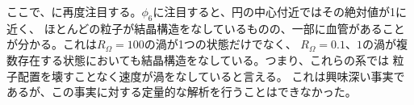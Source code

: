 \documentclass[/Users/ikedahajime/GitHub/reserch/master_report/thesis]{subfiles}
\begin{document}
ここで、に再度注目する。$\phi_6$に注目すると、円の中心付近ではその絶対値が1に近く、
ほとんどの粒子が結晶構造をなしているものの、一部に血管があることが分かる。これは$R_{\Omega}=100$の渦が1つの状態だけでなく、
$R_{\Omega}=0.1、1$の渦が複数存在する状態においても結晶構造をなしている。つまり、これらの系では
粒子配置を壊すことなく速度が渦をなしていると言える。
これは興味深い事実であるが、この事実に対する定量的な解析を行うことはできなかった。
\end{document}

